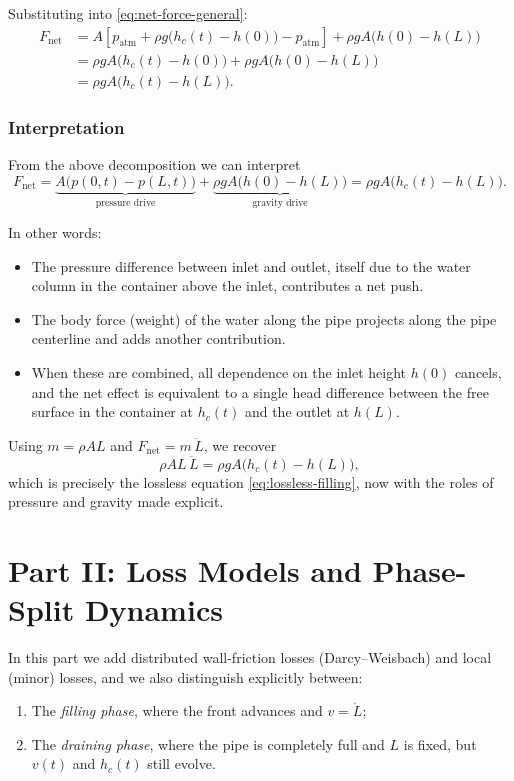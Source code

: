 \documentclass[11pt]{article}
\begin{document}
Substituting into \eqref{eq:net-force-general}:
\begin{align*}
F_{\text{net}}
  &= A\left[
      p_{\text{atm}} + \rho g\bigl(h_c(t) - h(0)\bigr)
      - p_{\text{atm}}
    \right]
    + \rho g A \bigl(h(0) - h(L)\bigr) \\
  &= \rho g A\bigl(h_c(t) - h(0)\bigr)
     + \rho g A\bigl(h(0) - h(L)\bigr) \\
  &= \rho g A\bigl(h_c(t) - h(L)\bigr).
\end{align*}

\subsubsection*{Interpretation}

From the above decomposition we can interpret
\[
F_{\text{net}} =
\underbrace{A\bigl(p(0,t) - p(L,t)\bigr)}_{\text{pressure drive}}
+
\underbrace{\rho g A \bigl(h(0) - h(L)\bigr)}_{\text{gravity drive}}
= \rho g A\bigl(h_c(t) - h(L)\bigr).
\]

In other words:
\begin{itemize}
  \item The pressure difference between inlet and outlet, itself due to the
        water column in the container above the inlet, contributes a net push.
  \item The body force (weight) of the water along the pipe projects along the
        pipe centerline and adds another contribution.
  \item When these are combined, all dependence on the inlet height $h(0)$
        cancels, and the net effect is equivalent to a single head difference
        between the free surface in the container at $h_c(t)$ and the outlet at
        $h(L)$.
\end{itemize}

Using $m = \rho A L$ and $F_{\text{net}} = m\,\ddot L$, we recover
\[
\rho A L \,\ddot L = \rho g A \bigl(h_c(t) - h(L)\bigr),
\]
which is precisely the lossless equation \eqref{eq:lossless-filling}, now with
the roles of pressure and gravity made explicit.

\section{Part II: Loss Models and Phase-Split Dynamics}

In this part we add distributed wall-friction losses (Darcy--Weisbach) and
local (minor) losses, and we also distinguish explicitly between:
\begin{enumerate}
  \item The \emph{filling phase}, where the front advances and $v = \dot L$;
  \item The \emph{draining phase}, where the pipe is completely full and $L$
        is fixed, but $v(t)$ and $h_c(t)$ still evolve.
\end{enumerate}
\end{document}
